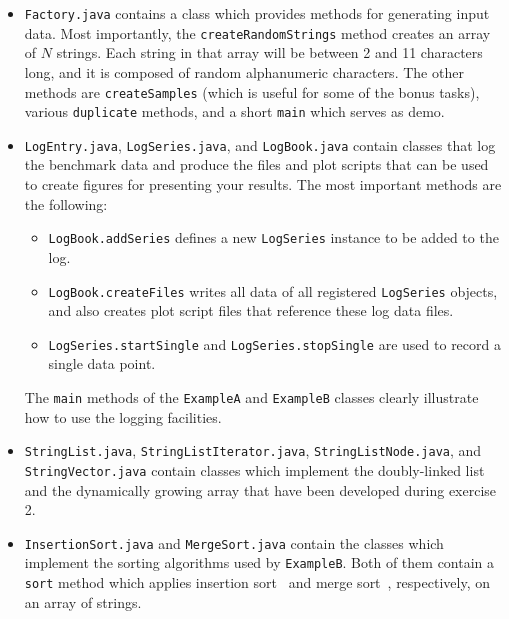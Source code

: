 \documentclass[a4paper,10pt]{article}
\begin{document}
\begin{itemize}

\item
  \texttt{Factory.java} contains a class which provides methods for generating input data.
  Most importantly, the \texttt{createRandomStrings} method creates an array of $N$ strings.
  Each string in that array will be between 2 and 11 characters long, and it is composed of random alphanumeric characters.
  The other methods are \texttt{createSamples} (which is useful for some of the bonus tasks), various \texttt{duplicate} methods, and a short \texttt{main} which serves as demo.

\item
  \texttt{LogEntry.java}, \texttt{LogSeries.java}, and \texttt{LogBook.java} contain classes
  that log the benchmark data and produce the files and plot scripts that can be used to create figures for presenting your results.
  The most important methods are the following:
  \begin{itemize}
  \item
    \texttt{LogBook.addSeries} defines a new \texttt{LogSeries} instance to be added to the log.
  \item
    \texttt{LogBook.createFiles} writes all data of all registered \texttt{LogSeries} objects, and also creates plot script files that reference these log data files.
  \item
    \texttt{LogSeries.startSingle} and \texttt{LogSeries.stopSingle} are used to record a single data point.
  \end{itemize}
  The \texttt{main} methods of the \texttt{ExampleA} and \texttt{ExampleB} classes clearly illustrate how to use the logging facilities.

\item
  \texttt{StringList.java}, \texttt{StringListIterator.java}, \texttt{StringListNode.java}, and \texttt{String\-Vector\-.java} contain classes which implement the doubly-linked list and the dynamically growing array that have been developed during exercise 2.

\item
  \texttt{InsertionSort.java} and \texttt{MergeSort.java} contain the classes which implement the sorting algorithms used by \texttt{ExampleB}.
  Both of them contain a \texttt{sort} method which applies insertion sort~\cite{wikipedia:insertion-sort} and merge sort~\cite{wikipedia:merge-sort}, respectively, on an array of strings.

\end{itemize}
\end{document}
